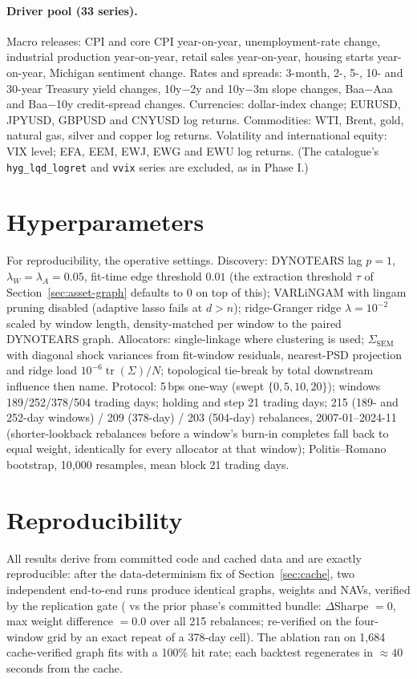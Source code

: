\paragraph{Driver pool (33 series).} Macro releases: CPI and core CPI
year-on-year, unemployment-rate change, industrial production
year-on-year, retail sales year-on-year, housing starts year-on-year,
Michigan sentiment change. Rates and spreads: 3-month, 2-, 5-, 10- and
30-year Treasury yield changes, 10y$-$2y and 10y$-$3m slope changes,
Baa$-$Aaa and Baa$-$10y credit-spread changes. Currencies: dollar-index
change; EURUSD, JPYUSD, GBPUSD and CNYUSD log returns. Commodities: WTI,
Brent, gold, natural gas, silver and copper log returns. Volatility and
international equity: VIX level; EFA, EEM, EWJ, EWG and EWU log returns.
(The catalogue's \texttt{hyg\_lqd\_logret} and \texttt{vvix} series are
excluded, as in Phase I.)

\section{Hyperparameters}

For reproducibility, the operative settings. Discovery: DYNOTEARS lag
$p=1$, $\lambda_W=\lambda_A=0.05$, fit-time edge threshold $0.01$ (the
extraction threshold $\tau$ of Section~\ref{sec:asset-graph} defaults to $0$
on top of this); VARLiNGAM with lingam pruning disabled (adaptive lasso
fails at $d>n$); ridge-Granger ridge $\lambda=10^{-2}$ scaled by window length,
density-matched per window to the paired DYNOTEARS graph.
Allocators: single-linkage where clustering is used;
$\Sigma_{\mathrm{SEM}}$ with diagonal shock variances from fit-window
residuals, nearest-PSD projection and ridge load
$10^{-6}\operatorname{tr}(\Sigma)/N$; topological tie-break by
total downstream influence then name.
Protocol: 5\,bps one-way (swept $\{0,5,10,20\}$); windows
189/252/378/504 trading days; holding and step 21 trading days; 215
(189- and 252-day windows) / 209 (378-day) / 203 (504-day) rebalances,
2007-01--2024-11
(shorter-lookback rebalances before a window's burn-in completes fall back
to equal weight, identically for every allocator at that window);
Politis--Romano bootstrap, 10{,}000 resamples, mean block 21 trading days.

\section{Reproducibility}

All results derive from committed code and cached data and are
exactly reproducible: after the data-determinism fix of
Section~\ref{sec:cache},
two independent end-to-end runs produce identical graphs, weights and
NAVs, verified by the replication gate (\skelsamp{} vs the prior phase's committed
bundle: $\Delta$Sharpe $= 0$, max weight difference $= 0.0$ over all 215
rebalances; re-verified on the four-window grid by an exact repeat
of a 378-day cell). The ablation ran on 1{,}684 cache-verified graph fits
with a 100\% hit rate; each backtest regenerates in ${\approx}40$ seconds
from the cache.

